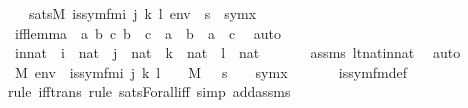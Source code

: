 \begin{isabellebody}
\ \ \ {\isachardoublequoteopen}sats{\isacharparenleft}{\kern0pt}M{\isacharcomma}{\kern0pt}\ is{\isacharunderscore}{\kern0pt}sym{\isacharunderscore}{\kern0pt}fm{\isacharparenleft}{\kern0pt}i{\isacharcomma}{\kern0pt}\ j{\isacharcomma}{\kern0pt}\ k{\isacharcomma}{\kern0pt}\ l{\isacharparenright}{\kern0pt}{\isacharcomma}{\kern0pt}\ env{\isacharparenright}{\kern0pt}\ {\isasymlongleftrightarrow}\ s\ {\isacharequal}{\kern0pt}\ sym{\isacharparenleft}{\kern0pt}x{\isacharparenright}{\kern0pt}{\isachardoublequoteclose}\ \isanewline
%
\isadelimproof
%
\endisadelimproof
%
\isatagproof
{}\isamarkupfalse%
\ {\isacharminus}{\kern0pt}\ \isanewline
\isanewline
\ \ \isamarkupfalse%
\ iff{\isacharunderscore}{\kern0pt}lemma\ {\isacharcolon}{\kern0pt}\ {\isachardoublequoteopen}{\isasymAnd}a\ b\ c{\isachardot}{\kern0pt}\ b\ {\isacharequal}{\kern0pt}\ c\ {\isasymLongrightarrow}\ a\ {\isacharequal}{\kern0pt}\ b\ {\isasymlongleftrightarrow}\ a\ {\isacharequal}{\kern0pt}\ c{\isachardoublequoteclose}\ \isamarkupfalse%
\ auto\isanewline
\isanewline
\ \ \isamarkupfalse%
\ innat\ {\isacharcolon}{\kern0pt}\ {\isachardoublequoteopen}i\ {\isasymin}\ nat\ {\isasymand}\ j\ {\isasymin}\ nat\ {\isasymand}\ k\ {\isasymin}\ nat\ {\isasymand}\ l\ {\isasymin}\ nat{\isachardoublequoteclose}\ \isanewline
\ \ \ \ \isamarkupfalse%
\ assms\ lt{\isacharunderscore}{\kern0pt}nat{\isacharunderscore}{\kern0pt}in{\isacharunderscore}{\kern0pt}nat\ \isamarkupfalse%
\ auto\isanewline
\isanewline
\ \ \isamarkupfalse%
\ {\isachardoublequoteopen}{\isacharparenleft}{\kern0pt}M{\isacharcomma}{\kern0pt}\ env\ {\isasymTurnstile}\ is{\isacharunderscore}{\kern0pt}sym{\isacharunderscore}{\kern0pt}fm{\isacharparenleft}{\kern0pt}i{\isacharcomma}{\kern0pt}\ j{\isacharcomma}{\kern0pt}\ k{\isacharcomma}{\kern0pt}\ l{\isacharparenright}{\kern0pt}{\isacharparenright}{\kern0pt}\ {\isasymlongleftrightarrow}\ {\isacharparenleft}{\kern0pt}{\isasymforall}{\isasympi}\ {\isasymin}\ M{\isachardot}{\kern0pt}\ {\isasympi}\ {\isasymin}\ s\ {\isasymlongleftrightarrow}\ {\isasympi}\ {\isasymin}\ sym{\isacharparenleft}{\kern0pt}x{\isacharparenright}{\kern0pt}{\isacharparenright}{\kern0pt}{\isachardoublequoteclose}\ \isanewline
\ \ \ \ \isamarkupfalse%
\ is{\isacharunderscore}{\kern0pt}sym{\isacharunderscore}{\kern0pt}fm{\isacharunderscore}{\kern0pt}def\ \isanewline
\ \ \ \ \isamarkupfalse%
{\isacharparenleft}{\kern0pt}rule\ iff{\isacharunderscore}{\kern0pt}trans{\isacharcomma}{\kern0pt}\ rule\ sats{\isacharunderscore}{\kern0pt}Forall{\isacharunderscore}{\kern0pt}iff{\isacharcomma}{\kern0pt}\ simp\ add{\isacharcolon}{\kern0pt}assms{\isacharparenright}{\kern0pt}\isanewline

\end{isabellebody}
